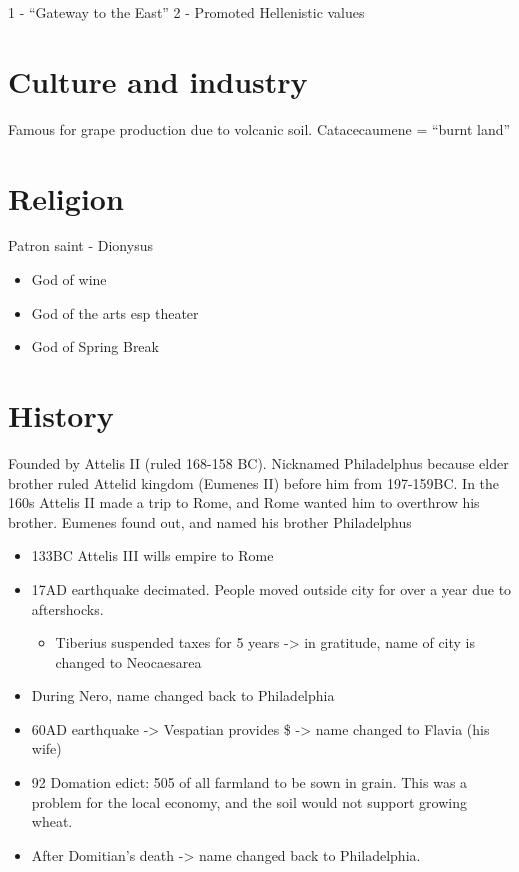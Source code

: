 \documentclass[
]{book}
\providecommand{\tightlist}{%
  \setlength{\itemsep}{0pt}\setlength{\parskip}{0pt}}
\begin{document}
1 - ``Gateway to the East''
2 - Promoted Hellenistic values

\hypertarget{culture-and-industry}{%
\section{Culture and industry}\label{culture-and-industry}}

Famous for grape production due to volcanic soil. Catacecaumene = ``burnt land''

\hypertarget{religion}{%
\section{Religion}\label{religion}}

Patron saint - Dionysus

\begin{itemize}
\tightlist
\item
  God of wine
\item
  God of the arts esp theater
\item
  God of Spring Break
\end{itemize}

\hypertarget{history-4}{%
\section{History}\label{history-4}}

Founded by Attelis II (ruled 168-158 BC). Nicknamed Philadelphus because elder brother ruled Attelid kingdom (Eumenes II) before him from 197-159BC. In the 160s Attelis II made a trip to Rome, and Rome wanted him to overthrow his brother. Eumenes found out, and named his brother Philadelphus

\begin{itemize}
\tightlist
\item
  133BC Attelis III wills empire to Rome
\item
  17AD earthquake decimated. People moved outside city for over a year due to aftershocks.

  \begin{itemize}
  \tightlist
  \item
    Tiberius suspended taxes for 5 years -\textgreater{} in gratitude, name of city is changed to Neocaesarea
  \end{itemize}
\item
  During Nero, name changed back to Philadelphia
\item
  60AD earthquake -\textgreater{} Vespatian provides \$ -\textgreater{} name changed to Flavia (his wife)
\item
  92 Domation edict: 505 of all farmland to be sown in grain. This was a problem for the local economy, and the soil would not support growing wheat.
\item
  After Domitian's death -\textgreater{} name changed back to Philadelphia.
\end{itemize}
\end{document}
